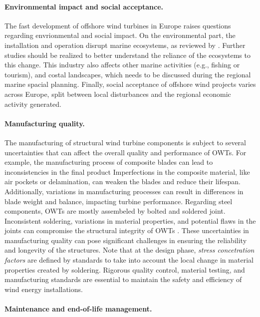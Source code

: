 \paragraph{Environmental impact and social acceptance.} 
The fast development of offshore wind turbines in Europe raises questions regarding envrionmental and social impact. 
On the environmental part, the installation and operation disrupt marine ecosystems, as reviewed by \citet{galparsoro_2022_owt_ecological_impact}. 
Further studies should be realized to better understand the reliance of the ecosystems to this change. 
This industry also affects other marine activities (e.g., fishing or tourism), and costal landscapes, which needs to be discussed during the regional marine spacial planning. 
Finally, social acceptance of offshore wind projects varies across Europe, split between local disturbances and the regional economic activity generated.  


\paragraph{Manufacturing quality.}
The manufacturing of structural wind turbine components is subject to several uncertainties that can affect the overall quality and performance of OWTs. 
For example, the manufacturing process of composite blades can lead to inconsistencies in the final product
Imperfections in the composite material, like air pockets or delamination, can weaken the blades and reduce their lifespan. 
Additionally, variations in manufacturing processes can result in differences in blade weight and balance, impacting turbine performance. 
Regarding steel components, OWTs are mostly assembeled by bolted and soldered joint. 
Inconsistent soldering, variations in material properties, and potential flaws in the joints can compromise the structural integrity of OWTs \citep{veers_2019_review}. 
These uncertainties in manufacturing quality can pose significant challenges in ensuring the reliability and longevity of the structures. 
Note that at the design phase, \textit{stress concetration factors} are defined by standards to take into account the local change in material properties created by soldering. 
Rigorous quality control, material testing, and manufacturing standards are essential to maintain the safety and efficiency of wind energy installations. 


\paragraph{Maintenance and end-of-life management.}

